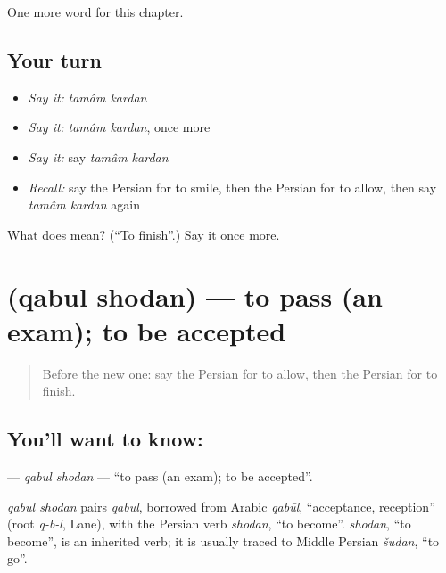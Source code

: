 \begin{grammarlens}[title={What you've built}]
One more word for this chapter.
\end{grammarlens}

\subsection*{Your turn}
\begin{itemize}
\raggedright
  \item \emph{Say it:} \emph{tamâm kardan}
  \item \emph{Say it:} \emph{tamâm kardan}, once more
  \item \emph{Say it:} say \emph{tamâm kardan}
  \item \emph{Recall:} say the Persian for to smile, then the Persian for to allow, then say \emph{tamâm kardan} again
\end{itemize}

\begin{tcolorbox}[breakable,colback=teal!4,colframe=teal!35!black,title={Before you move on}]
What does   mean? (\textquotedblleft{}To finish\textquotedblright{}.) Say it once more.
\end{tcolorbox}
\section[\texorpdfstring{\fa{قبول} \fa{شدن} (qabul shodan)}{قبول شدن (qabul shodan)}]{  (qabul shodan) — to pass (an exam); to be accepted}

\label{lesson:FA-C220-qabul-shodan}



\begin{quote}
Before the new one: say the Persian for to allow, then the Persian for to finish.
\end{quote}

\subsection*{You'll want to know:  }
\textbf{ } — \emph{qabul shodan} — \textquotedblleft{}to pass (an exam); to be accepted\textquotedblright{}.

\begin{cousinweb}
\emph{qabul shodan} pairs \emph{qabul}, borrowed from Arabic \emph{qabūl}, \textquotedblleft{}acceptance, reception\textquotedblright{} (root \emph{q-b-l}, Lane), with the Persian verb \emph{shodan}, \textquotedblleft{}to become\textquotedblright{}. \emph{shodan}, \textquotedblleft{}to become\textquotedblright{}, is an inherited verb; it is usually traced to Middle Persian \emph{šudan}, \textquotedblleft{}to go\textquotedblright{}.
\end{cousinweb}

